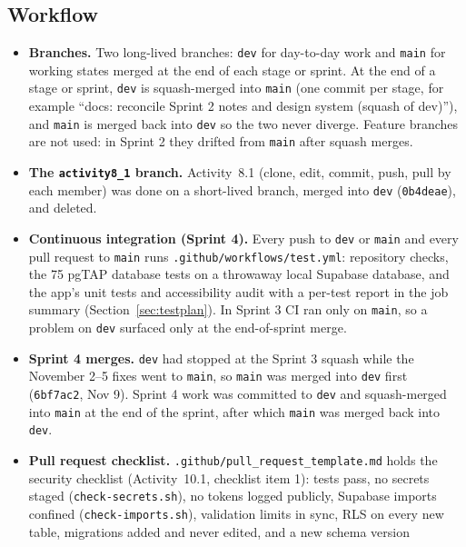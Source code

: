 \documentclass[12pt,letterpaper]{article}
\begin{document}
\subsection{Workflow}
\begin{itemize}
  \item \textbf{Branches.} Two long-lived branches: \texttt{dev} for day-to-day work
        and \texttt{main} for working states merged at the end of each stage or sprint. At the end of a stage or sprint,
        \texttt{dev} is squash-merged into \texttt{main} (one commit per stage, for
        example ``docs: reconcile Sprint 2 notes and design system (squash of dev)''), and \texttt{main} is merged
        back into \texttt{dev} so the two never diverge. Feature branches are not used:
        in Sprint 2 they drifted from \texttt{main} after squash merges.
  \item \textbf{The \texttt{activity8\_1} branch.} Activity~8.1 (clone, edit,
        commit, push, pull by each member) was done on a short-lived branch, merged
        into \texttt{dev} (\texttt{0b4deae}), and deleted.
  \item \textbf{Continuous integration (Sprint 4).} Every push to \texttt{dev} or
        \texttt{main} and every pull request to \texttt{main} runs
        \texttt{.github/workflows/test.yml}: repository checks, the 75 pgTAP database
        tests on a throwaway local Supabase database, and the app's unit tests and
        accessibility audit with a per-test report in the job summary
        (Section~\ref{sec:testplan}). In Sprint 3 CI ran only on \texttt{main}, so a
        problem on \texttt{dev} surfaced only at the end-of-sprint merge.
  \item \textbf{Sprint 4 merges.} \texttt{dev} had stopped at the Sprint 3 squash
        while the November 2--5 fixes went to \texttt{main}, so \texttt{main} was
        merged into \texttt{dev} first (\texttt{6bf7ac2}, Nov 9). Sprint 4 work was
        committed to \texttt{dev} and squash-merged into \texttt{main} at the end of
        the sprint, after which \texttt{main} was merged back into \texttt{dev}.
  \item \textbf{Pull request checklist.} \texttt{.github/pull\_request\_template.md}
        holds the security checklist (Activity~10.1, checklist item 1): tests pass, no
        secrets staged (\texttt{check-secrets.sh}), no tokens logged publicly, Supabase
        imports confined (\texttt{check-imports.sh}), validation limits in sync, RLS on
        every new table, migrations added and never edited, and a new schema version

\end{itemize}
\end{document}
